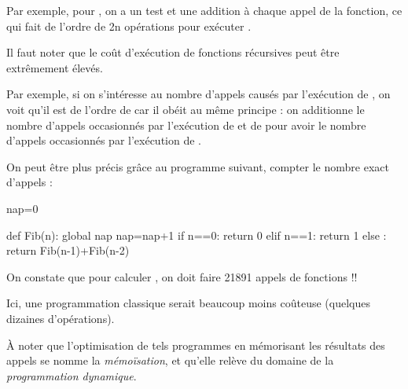 \documentclass[11pt,a4paper,french,twoside]{PMCours}
\begin{document}
Par exemple, pour , on a un test et une addition à chaque appel
de la fonction, ce qui fait de l'ordre de 2n opérations pour exécuter 
. 


Il faut noter que le coût d'exécution de fonctions récursives peut être 
extrêmement élevés.


Par exemple, si on s'intéresse au nombre d'appels causés par l'exécution de
, on voit qu'il est de l'ordre de  car il obéit 
au même principe : on additionne le nombre d'appels occasionnés par l'exécution 
de  et de  pour avoir le nombre d'appels 
occasionnés par l'exécution de .


On peut être plus précis grâce au programme suivant, compter 
le nombre exact d'appels :

\begin{Python}
nap=0

def Fib(n):
    global nap
    nap=nap+1
    if n==0:
        return 0
    elif n==1:
        return 1
    else :
        return Fib(n-1)+Fib(n-2)
\end{Python}

On constate que pour calculer ,
on doit faire 21891 appels de fonctions !! 

Ici, une programmation classique serait beaucoup moins coûteuse
(quelques dizaines d'opérations).

À noter que l'optimisation de tels programmes en mémorisant les résultats
des appels se nomme la \emph{mémoïsation}, et qu'elle relève du domaine 
de la \emph{programmation dynamique}.
 
\end{document}
